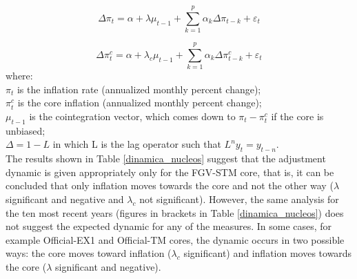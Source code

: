 \documentclass[10pt]{article}
\begin{document}
\begin{equation}
\label{equacao_mehra1}
\Delta\pi_t = \alpha + \lambda\mu_{t-1} + \sum_{k=1}^{p}\alpha_k\Delta\pi_{t-k} + \varepsilon_t 
\end{equation}

\begin{equation}
\label{equacao_mehra2}
\Delta\pi_t^{c} = \alpha + \lambda_{c}\mu_{t-1} + \sum_{k=1}^{p}\alpha_k\Delta\pi_{t-k}^{c} + \varepsilon_t
\end{equation}
\noindent
where:\\
$\pi_t$ is the inflation rate (annualized monthly percent change);\\
$\pi_t^{c}$ is the core inflation (annualized monthly percent change);\\
$\mu_{t-1}$ is the cointegration vector, which comes down to $\pi_t - \pi_t^{c}$ if the core is unbiased;\\
$\Delta = 1-L$ in which L is the lag operator such that $L^ny_t = y_{t-n}$.\\

The results shown in Table \ref{dinamica_nucleos} suggest that the adjustment dynamic is given appropriately only for the FGV-STM core, that is, it can be concluded that only inflation moves towards the core and not the other way ($\lambda$ significant and negative and $\lambda_c$ not significant). However, the same analysis for the ten most recent years (figures in brackets in Table \ref{dinamica_nucleos}) does not suggest the expected dynamic for any of the measures. In some cases, for example Official-EX1 and Official-TM cores, the dynamic occurs in two possible ways: the core moves toward inflation ($\lambda_c$ significant) and inflation moves towards the core ($\lambda$ significant and negative).

\end{document}
